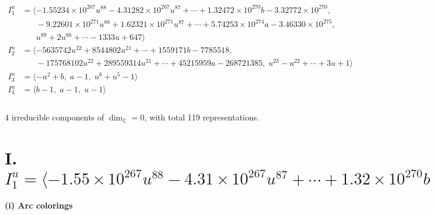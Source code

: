 \documentclass[1p]{elsarticle_modified}
\theoremstyle{definition}
\begin{document}
\begin{align*}
I^u_{1}&=\langle 
-1.55234\times10^{267} u^{88}-4.31282\times10^{267} u^{87}+\cdots+1.32472\times10^{270} b-3.32772\times10^{270},\\
\phantom{I^u_{1}}&\phantom{= \langle  }-9.22601\times10^{271} u^{88}+1.62321\times10^{271} u^{87}+\cdots+5.74253\times10^{274} a-3.46330\times10^{275},\\
\phantom{I^u_{1}}&\phantom{= \langle  }u^{89}+2 u^{88}+\cdots-1333 u+647\rangle \\
I^u_{2}&=\langle 
-5635742 u^{22}+8544802 u^{21}+\cdots+1559171 b-7785518,\\
\phantom{I^u_{2}}&\phantom{= \langle  }-175768102 u^{22}+289559314 u^{21}+\cdots+45215959 a-268721385,\;u^{23}- u^{22}+\cdots+3 u+1\rangle \\
I^u_{3}&=\langle 
- u^2+b,\;a-1,\;u^6+u^5-1\rangle \\
I^u_{4}&=\langle 
b-1,\;a-1,\;u-1\rangle \\
\\
\end{align*}
\raggedright * 4 irreducible components of $\dim_{\mathbb{C}}=0$, with total 119 representations.\\
\newpage
\renewcommand{\arraystretch}{1}
\centering \section*{I. $I^u_{1}= \langle -1.55\times10^{267} u^{88}-4.31\times10^{267} u^{87}+\cdots+1.32\times10^{270} b-3.33\times10^{270},\;-9.23\times10^{271} u^{88}+1.62\times10^{271} u^{87}+\cdots+5.74\times10^{274} a-3.46\times10^{275},\;u^{89}+2 u^{88}+\cdots-1333 u+647 \rangle$}
\flushleft \textbf{(i) Arc colorings}\\
\end{document}
